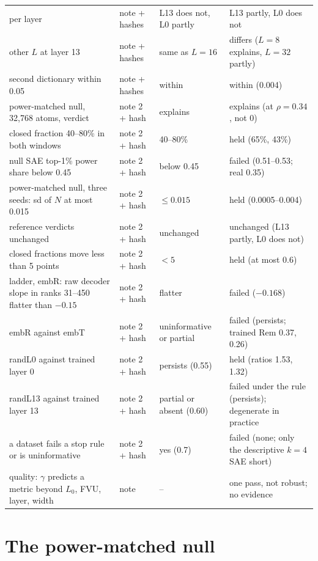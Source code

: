 \documentclass[10pt,twocolumn]{article}
\newcommand{\Lz}{L_0}
\begin{document}
\begin{table}[!htb]
\begin{tabular}{p{4.6cm} p{2.0cm} p{2.6cm} p{6.4cm}}
\quad per layer & note + hashes & L13 does not, L0 partly & L13 partly, L0 does not \\
\quad other $L$ at layer 13 & note + hashes & same as $L=16$ & differs ($L=8$ explains, $L=32$ partly) \\
\quad second dictionary within 0.05 & note + hashes & within & within (0.004) \\
power-matched null, 32,768 atoms, verdict & note 2 + hash & explains & explains (at $\rho=0.34$, not 0) \\
\quad closed fraction 40--80\% in both windows & note 2 + hash & 40--80\% & held (65\%, 43\%) \\
\quad null SAE top-1\% power share below 0.45 & note 2 + hash & below 0.45 & failed (0.51--0.53; real 0.35) \\
power-matched null, three seeds: sd of $N$ at most 0.015 & note 2 + hash & $\le 0.015$ & held (0.0005--0.004) \\
\quad reference verdicts unchanged & note 2 + hash & unchanged & unchanged (L13 partly, L0 does not) \\
\quad closed fractions move less than 5 points & note 2 + hash & $<5$ & held (at most 0.6) \\
ladder, embR: raw decoder slope in ranks 31--450 flatter than $-0.15$ & note 2 + hash & flatter & failed ($-0.168$) \\
\quad embR against embT & note 2 + hash & uninformative or partial & failed (persists; trained Rem 0.37, 0.26) \\
\quad randL0 against trained layer 0 & note 2 + hash & persists (0.55) & held (ratios 1.53, 1.32) \\
\quad randL13 against trained layer 13 & note 2 + hash & partial or absent (0.60) & failed under the rule (persists); degenerate in practice \\
\quad a dataset fails a stop rule or is uninformative & note 2 + hash & yes (0.7) & failed (none; only the descriptive $k=4$ SAE short) \\
quality: $\gamma$ predicts a metric beyond $\Lz$, FVU, layer, width & note & -- & one pass, not robust; no evidence \\
\bottomrule
\end{tabular}
\end{table}

\section{The power-matched null}
\label{app:pmatch}
\end{document}
